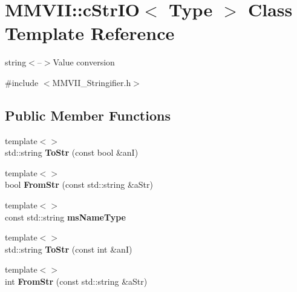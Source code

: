 \hypertarget{classMMVII_1_1cStrIO}{}\section{M\+M\+V\+II\+:\+:c\+Str\+IO$<$ Type $>$ Class Template Reference}
\label{classMMVII_1_1cStrIO}


string$<$--$>$Value conversion  




{\ttfamily \#include $<$M\+M\+V\+I\+I\+\_\+\+Stringifier.\+h$>$}

\subsection*{Public Member Functions}
\begin{DoxyCompactItemize}
\item 
{\footnotesize template$<$$>$ }\\std\+::string {\bfseries To\+Str} (const bool \&anI)\hypertarget{classMMVII_1_1cStrIO_a3461aaa745c3462405b0abe91ce1d55b}{}\label{classMMVII_1_1cStrIO_a3461aaa745c3462405b0abe91ce1d55b}

\item 
{\footnotesize template$<$$>$ }\\bool {\bfseries From\+Str} (const std\+::string \&a\+Str)\hypertarget{classMMVII_1_1cStrIO_a80ed3fc6679e134d919eb443236d6686}{}\label{classMMVII_1_1cStrIO_a80ed3fc6679e134d919eb443236d6686}

\item 
{\footnotesize template$<$$>$ }\\const std\+::string {\bfseries ms\+Name\+Type}\hypertarget{classMMVII_1_1cStrIO_a35e797d2eb77f8aed68737b7fb7de5dc}{}\label{classMMVII_1_1cStrIO_a35e797d2eb77f8aed68737b7fb7de5dc}

\item 
{\footnotesize template$<$$>$ }\\std\+::string {\bfseries To\+Str} (const int \&anI)\hypertarget{classMMVII_1_1cStrIO_a86fe9b5f58d9e0873f94ac3559124a07}{}\label{classMMVII_1_1cStrIO_a86fe9b5f58d9e0873f94ac3559124a07}

\item 
{\footnotesize template$<$$>$ }\\int {\bfseries From\+Str} (const std\+::string \&a\+Str)\hypertarget{classMMVII_1_1cStrIO_ae077e90e3000402ae969972ad30c27a1}{}\label{classMMVII_1_1cStrIO_ae077e90e3000402ae969972ad30c27a1}


\end{DoxyCompactItemize}
